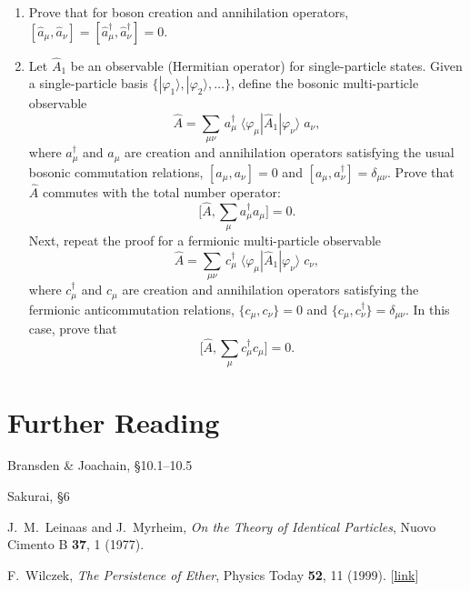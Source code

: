 \documentclass[pra,12pt]{revtex4-2}
\begin{document}
\begin{enumerate}
\item
  Prove that for boson creation and annihilation operators, $[\hat{a}_\mu,\hat{a}_\nu] = [\hat{a}_\mu^\dagger,\hat{a}_\nu^\dagger] = 0$.
  \label{ex:boson_commutators}

\item
  Let $\hat{A}_1$ be an observable (Hermitian operator) for
  single-particle states.  Given a single-particle basis
  $\{|\varphi_1\rangle,|\varphi_2\rangle,\dots\}$, define the
  bosonic multi-particle observable
  \begin{equation}
    \hat{A} = \sum_{\mu\nu} \,a^\dagger_\mu \; \langle\varphi_\mu|\hat{A}_1|\varphi_\nu\rangle \; a_\nu,
  \end{equation}
  where $a_\mu^\dagger$ and $a_\mu$ are creation and annihilation
  operators satisfying the usual bosonic commutation relations,
  $[a_\mu,a_\nu] = 0$ and $[a_\mu,a_\nu^\dagger] = \delta_{\mu\nu}$.
  Prove that $\hat{A}$ commutes with the total number operator:
  \begin{equation}
    \Big[\hat{A}, \sum_\mu a^\dagger_\mu a_\mu \Big] = 0.
  \end{equation}
  Next, repeat the proof for a fermionic multi-particle observable
  \begin{equation}
    \hat{A} = \sum_{\mu\nu} \,c^\dagger_\mu \; \langle\varphi_\mu|\hat{A}_1|\varphi_\nu\rangle \; c_\nu,
  \end{equation}
  where $c_\mu^\dagger$ and $c_\mu$ are creation and annihilation
  operators satisfying the fermionic anticommutation relations,
  $\{c_\mu,c_\nu\} = 0$ and $\{c_\mu,c_\nu^\dagger\} = \delta_{\mu\nu}$.
  In this case, prove that
  \begin{equation}
    \Big[\hat{A}, \sum_\mu c^\dagger_\mu c_\mu \Big] = 0.
  \end{equation}
  \label{ex:n_conserved}

\end{enumerate}

\section*{Further Reading}

\begin{enumerate}[[1{]}]
\item Bransden \& Joachain, \S10.1--10.5

\item Sakurai, \S6

\item J.~M.~Leinaas and J.~Myrheim, \textit{On the Theory of Identical Particles}, Nuovo Cimento B \textbf{37}, 1 (1977).
  \label{cite:leinaas}
  
\item F.~Wilczek, \textit{The Persistence of Ether}, Physics Today
  \textbf{52}, 11 (1999). [\href{http://physicstoday.scitation.org/doi/10.1063/1.882562}{link}]
\label{cite:wilczek}
\end{enumerate}
\end{document}
